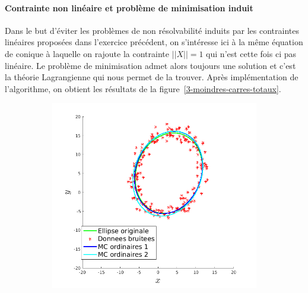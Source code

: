 \documentclass{article}
\begin{document}
\paragraph{Contrainte non linéaire et problème de minimisation induit}
Dans le but d'éviter les problèmes de non résolvabilité induits par les contraintes linéaires proposées dans l'exercice précédent, on s'intéresse ici à la même équation de conique à laquelle on rajoute la contrainte $||X|| = 1$ qui n'est cette fois ci pas linéaire. Le problème de minimisation admet alors toujours une solution et c'est la théorie Lagrangienne qui nous permet de la trouver. Après implémentation de l'algorithme, on obtient les résultats de la figure~\ref{3-moindres-carres-totaux}.
\begin{figure}[!ht]
    \centering
    \begin{subfigure}[c]{0.49\linewidth}
        \centering
        \includegraphics[width=\linewidth]{images/4-mco_1.png}
    \end{subfigure}
    \begin{subfigure}[c]{0.49\linewidth}
        \centering

\end{subfigure}
\end{figure}
\end{document}
